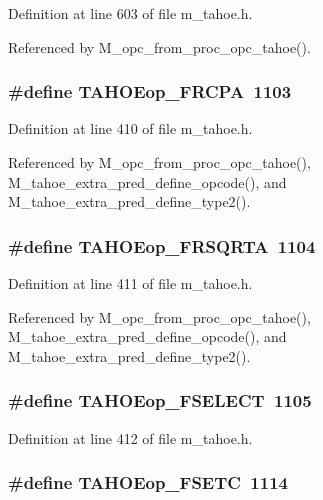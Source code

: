 Definition at line 603 of file m\_\-tahoe.h.

Referenced by M\_\-opc\_\-from\_\-proc\_\-opc\_\-tahoe().
\subsubsection{\setlength{\rightskip}{0pt plus 5cm}\#define TAHOEop\_\-FRCPA~1103}\label{m__tahoe_8h_34856d0f21a2a9183432c3c69381dc15}




Definition at line 410 of file m\_\-tahoe.h.

Referenced by M\_\-opc\_\-from\_\-proc\_\-opc\_\-tahoe(), M\_\-tahoe\_\-extra\_\-pred\_\-define\_\-opcode(), and M\_\-tahoe\_\-extra\_\-pred\_\-define\_\-type2().
\subsubsection{\setlength{\rightskip}{0pt plus 5cm}\#define TAHOEop\_\-FRSQRTA~1104}\label{m__tahoe_8h_9411e0fd72dcbae49ba64f6bc2176d54}




Definition at line 411 of file m\_\-tahoe.h.

Referenced by M\_\-opc\_\-from\_\-proc\_\-opc\_\-tahoe(), M\_\-tahoe\_\-extra\_\-pred\_\-define\_\-opcode(), and M\_\-tahoe\_\-extra\_\-pred\_\-define\_\-type2().
\subsubsection{\setlength{\rightskip}{0pt plus 5cm}\#define TAHOEop\_\-FSELECT~1105}\label{m__tahoe_8h_a2e610b6bf1f94f701139373b9742999}




Definition at line 412 of file m\_\-tahoe.h.
\subsubsection{\setlength{\rightskip}{0pt plus 5cm}\#define TAHOEop\_\-FSETC~1114}\label{m__tahoe_8h_5db1d7e3a88c801aa4fc7a944a10acab}




